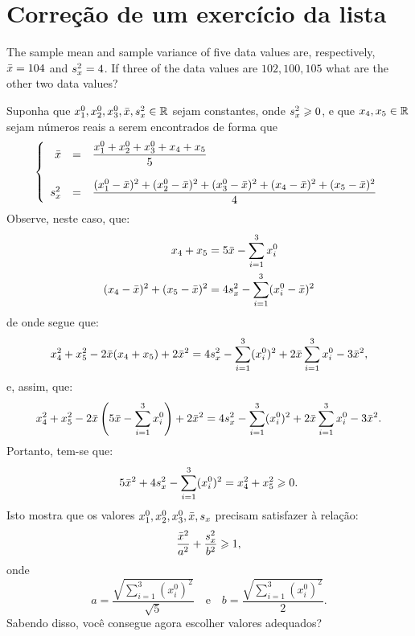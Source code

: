 \section{Correção de um exercício da lista}\label{sec:correcao-de-um-exercício-da-lista}

\begin{exercise}
  The sample mean and sample variance of five data values are, respectively,
  \(\bar{x}=104\) and \(s_{x}^{2}=4\). If three of the data
  values are \(102,100,105\) what are the other two data values?
\end{exercise}

Suponha que
\(x_{1}^{0},x_{2}^{0},x_{3}^{0},\bar{x},s_{x}^{2}\in\mathbb{R}\)
sejam constantes, onde \(s_{x}^{2}\geqslant{0}\), e que
\(x_{4},x_{5}\in\mathbb{R}\) sejam números reais a serem encontrados de forma que
\[
  \left\{
    \begin{array}{rcl}
      \bar{x}
      &=&
      \dfrac{
        x_{1}^{0}+x_{2}^{0}+x_{3}^{0}+x_{4}+x_{5}
      }{5}
      \\
      &&
      \\
      s_{x}^{2}
      &=&
      \dfrac{
        (x_{1}^{0}-\bar{x})^{2}
        +
        (x_{2}^{0}-\bar{x})^{2}
        +
        (x_{3}^{0}-\bar{x})^{2}
        +
        (x_{4}-\bar{x})^{2}
        +
        (x_{5}-\bar{x})^{2}
      }{4}
    \end{array}
  \right.
\]
Observe, neste caso, que:
\begin{align}
  x_{4}+x_{5}
  &=
  5\bar{x}
  -
  \sum_{i=1}^{3}x_{i}^{0}
  \\
  (x_{4}-\bar{x})^{2}
  +
  (x_{5}-\bar{x})^{2}
  &=
  4s_{x}^{2}
  -
  \sum_{i=1}^{3}(x_{i}^{0}-\bar{x})^{2}
\end{align}
de onde segue que:
\[
  x_{4}^{2}+x_{5}^{2}
  -
  2\bar{x}(x_{4}+x_{5})
  +
  2\bar{x}^{2}
  =
  4s_{x}^{2}
  -
  \sum_{i=1}^{3}(x_{i}^{0})^{2}
  +
  2\bar{x}\sum_{i=1}^{3}x_{i}^{0}
  -
  3\bar{x}^{2}
  ,
\]
e, assim, que:
\[
  x_{4}^{2}+x_{5}^{2}
  -
  2
  \bar{x}
  \left(
    5\bar{x}
    -
    \sum_{i=1}^{3}x_{i}^{0}
  \right)
  +
  2\bar{x}^{2}
  =
  4s_{x}^{2}
  -
  \sum_{i=1}^{3}(x_{i}^{0})^{2}
  +
  2\bar{x}\sum_{i=1}^{3}x_{i}^{0}
  -
  3\bar{x}^{2}.
\]
Portanto, tem-se que:
\[
  5\bar{x}^{2}+4s_{x}^{2}-\sum_{i=1}^{3}(x_{i}^{0})^{2}
  =
  x_{4}^{2}+x_{5}^{2}
  \geqslant{0}.
\]
Isto mostra que os valores
\(x_{1}^{0},x_{2}^{0},x_{3}^{0},\bar{x},s_{x}\)
precisam satisfazer à relação:
\[
  \frac{\bar{x}^{2}}{a^{2}}
  +
  \frac{s_{x}^{2}}{b^{2}}
  \geqslant{1}
  ,
\]
onde
\[
  a=\frac{\sqrt{\sum_{i=1}^{3}(x_{i}^{0})^{2}}}{\sqrt{5}}
  \quad
  \text{e}
  \quad
  b=\frac{\sqrt{\sum_{i=1}^{3}(x_{i}^{0})^{2}}}{2}
  .
\]
Sabendo disso, você consegue agora escolher valores adequados?
